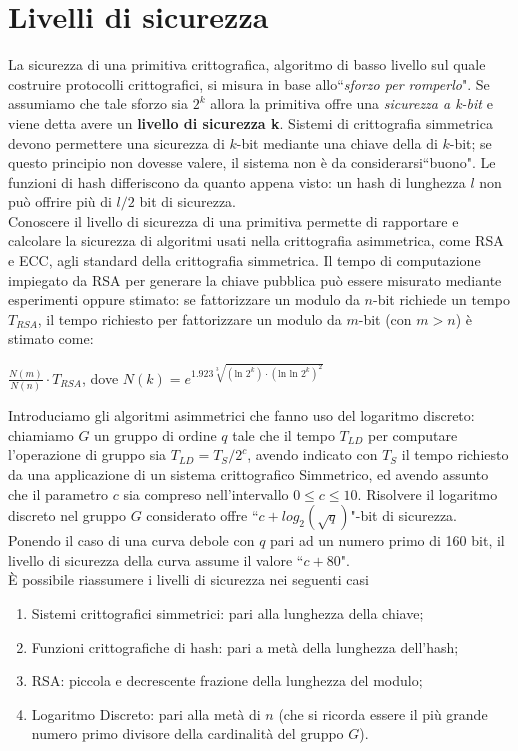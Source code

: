 \documentclass[a4paper,12pt]{tesiinfo}
\newcommand\ddfrac[2]{\frac{\displaystyle #1}{\displaystyle #2}}
\begin{document}
\chapter{Livelli di sicurezza}
La sicurezza di una primitiva crittografica, algoritmo di basso livello sul quale costruire protocolli crittografici, si misura in base allo``\textit{sforzo per romperlo}". Se assumiamo che tale sforzo sia $2^k$ allora la primitiva offre una \textit{sicurezza a k-bit} e viene detta avere un \textbf{livello di sicurezza k}. Sistemi di crittografia simmetrica devono permettere una sicurezza di $k$-bit mediante una chiave della di $k$-bit; se questo principio non dovesse valere, il sistema non \`e da considerarsi``buono". Le funzioni di hash differiscono da quanto appena visto: un hash di lunghezza $l$ non pu\`o offrire pi\`u di $l \big / 2$ bit di sicurezza. 
\\
Conoscere il livello di sicurezza di una primitiva permette di rapportare e calcolare la sicurezza di algoritmi usati nella crittografia asimmetrica, come RSA e ECC, agli standard della crittografia simmetrica. Il tempo di computazione impiegato da RSA per generare la chiave pubblica pu\`o essere misurato mediante esperimenti oppure stimato: se fattorizzare un modulo da $n$-bit richiede un tempo $T_{RSA}$, il tempo richiesto per fattorizzare un modulo da $m$-bit (con $m>n$) \`e stimato come: 
\begin{center}
  $ \ddfrac{N(m)}{N(n)} \cdot T_{RSA}$, dove $N(k) = e^{1.923 \sqrt[3]{( \text{ln }2^k) \cdot ( \text{ln ln }2^k)^{2}}}$
\end{center}
Introduciamo gli algoritmi asimmetrici che fanno uso del logaritmo discreto: chiamiamo $G$ un gruppo di ordine $q$ tale che il tempo $T_{LD}$ per computare l'operazione di gruppo sia $T_{LD} = T_S \big / 2^c$, avendo indicato con $T_S$ il tempo richiesto da una applicazione di un sistema crittografico Simmetrico, ed avendo assunto che il parametro $c$ sia compreso nell'intervallo $0 \leq c \leq 10$. Risolvere il logaritmo discreto nel gruppo $G$ considerato offre ``$c+log_2(\sqrt{q})$"-bit di sicurezza. Ponendo il caso di una curva debole con $q$ pari ad un numero primo di 160 bit, il livello di sicurezza della curva assume il valore ``$c+80$".
\\
\`E possibile riassumere i livelli di sicurezza nei seguenti casi
\begin{enumerate}
  \item Sistemi crittografici simmetrici: pari alla lunghezza della chiave;
  \item Funzioni crittografiche di hash: pari a met\`a della lunghezza dell'hash;
  \item RSA: piccola e decrescente frazione della lunghezza del modulo;
  \item Logaritmo Discreto: pari alla met\`a di $n$ (che si ricorda essere il pi\`u grande numero primo divisore della cardinalit\`a del gruppo $G$).
\end{enumerate}
\end{document}

